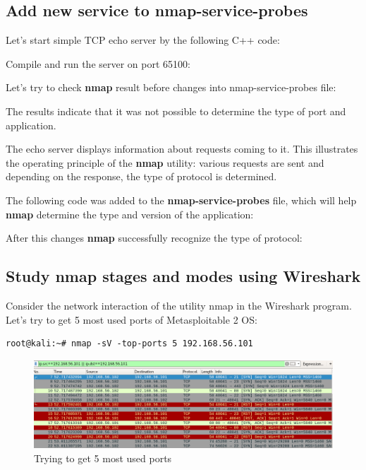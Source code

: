 \documentclass[14pt,a4paper,report]{report}
\begin{document}


\subsection{Add new service to nmap-service-probes}

Let's start simple TCP echo server by the following C++ code:



Compile and run the server on port 65100:



Let's try to check \textbf{nmap} result before changes into nmap-service-probes file:



The results indicate that it was not possible to determine the type of port and application.

The echo server displays information about requests coming to it. This illustrates the operating principle of the \textbf{nmap} utility: various requests are sent and depending on the response, the type of protocol is determined.



The following code was added to the \textbf{nmap-service-probes} file, which will help \textbf{nmap} determine the type and version of the application:



After this changes \textbf{nmap} successfully recognize the type of protocol:



\subsection{Study nmap stages and modes using Wireshark}

Consider the network interaction of the utility nmap in the Wireshark program. Let's try to get 5 most used ports of Metasploitable 2 OS:

\begin{verbatim}
root@kali:~# nmap -sV -top-ports 5 192.168.56.101
\end{verbatim}

\begin{figure}[h!]
	\centering
	\includegraphics[scale = 0.53]{images/4.png}
	\caption{Trying to get 5 most used ports}
\end{figure}
\end{document}
